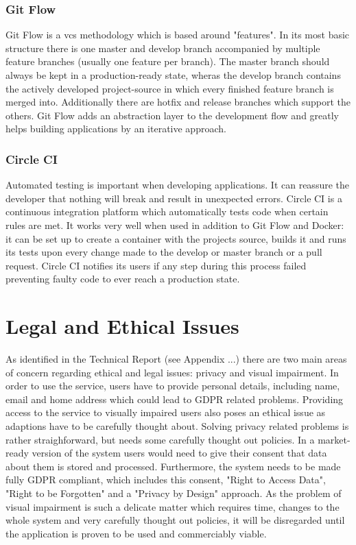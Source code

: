 \subsubsection{Git Flow}
Git Flow is a \acrshort{vcs} methodology which is based around "features". In its most basic structure there is one master and develop branch accompanied by multiple feature branches (usually one feature per branch). The master branch should always be kept in a production-ready state, wheras the develop branch contains the actively developed project-source in which every finished feature branch is merged into. Additionally there are hotfix and release branches which support the others. Git Flow adds an abstraction layer to the development flow and greatly helps building applications by an iterative approach.

\subsubsection{Circle CI}
Automated testing is important when developing applications. It can reassure the developer that nothing will break and result in unexpected errors. Circle CI is a continuous integration platform which automatically tests code when certain rules are met. It works very well when used in addition to Git Flow and Docker: it can be set up to create a container with the projects source, builds it and runs its tests upon every change made to the develop or master branch or a pull request. Circle CI notifies its users if any step during this process failed preventing faulty code to ever reach a production state.

\section{Legal and Ethical Issues}
As identified in the Technical Report (see Appendix ...) there are two main areas of concern regarding ethical and legal issues: privacy and visual impairment. In order to use the service, users have to provide personal details, including name, email and home address which could lead to GDPR related problems. Providing access to the service to visually impaired users also poses an ethical issue as adaptions have to be carefully thought about. Solving privacy related problems is rather straighforward, but needs some carefully thought out policies. In a market-ready version of the system users would need to give their consent that data about them is stored and processed. Furthermore, the system needs to be made fully GDPR compliant, which includes this consent, "Right to Access Data", "Right to be Forgotten" and a "Privacy by Design" approach. As the problem of visual impairment is such a delicate matter which requires time, changes to the whole system and very carefully thought out policies, it will be disregarded until the application is proven to be used and commerciably viable.  